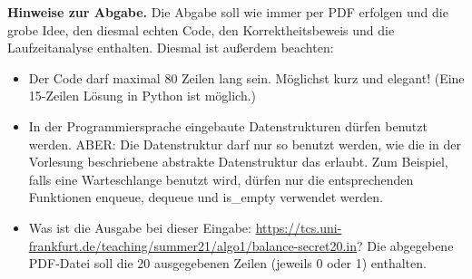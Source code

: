 \documentclass{uebung_cs}
\begin{document}
\textbf{Hinweise zur Abgabe.}
Die Abgabe soll wie immer per PDF erfolgen und die grobe Idee, den diesmal echten Code, den Korrektheitsbeweis und die Laufzeitanalyse enthalten.
Diesmal ist außerdem beachten:
\begin{itemize}
\item Der Code darf maximal 80 Zeilen lang sein. Möglichst kurz und elegant! (Eine 15-Zeilen Lösung in Python ist möglich.)
\item In der Programmiersprache eingebaute Datenstrukturen dürfen benutzt werden. ABER: Die Datenstruktur darf nur so benutzt werden, wie die in der Vorlesung beschriebene abstrakte Datenstruktur das erlaubt. Zum Beispiel, falls eine Warteschlange benutzt wird, dürfen nur die entsprechenden Funktionen enqueue, dequeue und is\_empty verwendet werden.
\item Was ist die Ausgabe bei dieser Eingabe: \url{https://tcs.uni-frankfurt.de/teaching/summer21/algo1/balance-secret20.in}? Die abgegebene PDF-Datei soll die 20 ausgegebenen Zeilen (jeweils 0 oder 1) enthalten.
\end{itemize}
\end{document}
